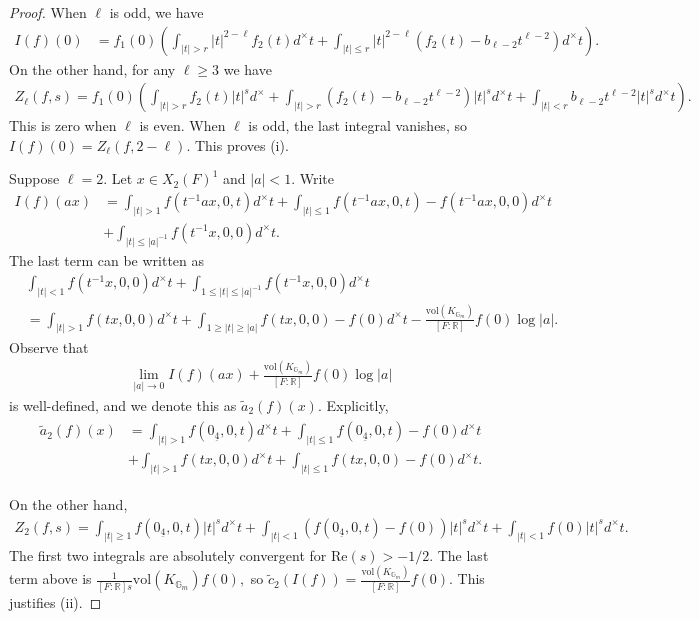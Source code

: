 \documentclass[11pt,a4paper,reqno]{amsart}
\theoremstyle{remark}
\numberwithin{equation}{section}
\newcommand{\RR}{\mathbb{R}}
\newcommand{\GG}{\mathbb{G}}
\theoremstyle{definition}
\numberwithin{equation}{section}
\begin{document}
\begin{proof}
    When $\ell$ is odd, we have 
    \begin{align*}
        I(f)(0)&=f_1(0)\left(\int_{|t|>r} |t|^{2-\ell}f_2(t) d^\times t+\int_{|t|\le r} |t|^{2-\ell}\left(f_2(t)-b_{\ell-2}t^{\ell-2}\right) d^\times t\right).
    \end{align*}
    On the other hand, for any $\ell\ge 3$ we have
    \begin{align*}
        Z_\ell(f,s)=f_1(0)\left(\int_{|t|>r} f_2(t)|t|^{s}d^\times+\int_{|t|>r} (f_2(t)-b_{\ell-2}t^{\ell-2})|t|^sd^\times t+\int_{|t|<r} b_{\ell-2}t^{\ell-2}|t|^s d^\times t\right).
    \end{align*}
    This is zero when $\ell$ is even. When $\ell$ is odd, the last integral vanishes, so $I(f)(0)=Z_\ell(f,2-\ell).$ This proves (i). 
    
    Suppose $\ell=2$. Let $x\in X_2(F)^1 $ and $|a|<1$. Write
    \begin{align*}
        I(f)(ax)&=\int_{|t|>1} f(t^{-1}ax,0,t)d^\times t+ \int_{|t|\le 1} f(t^{-1}ax,0,t)-f(t^{-1}ax,0,0)d^\times t\\
        &+\int_{|t|\le |a|^{-1}} f(t^{-1}x,0,0)d^\times t.
    \end{align*}
    The last term can be written as
    \begin{align*}
         &\int_{|t|< 1} f(t^{-1}x,0,0)d^\times t+\int_{1\le |t|\le |a|^{-1}} f(t^{-1}x,0,0)d^\times t\\
    &=\int_{|t|> 1} f(tx,0,0)d^\times t+\int_{1\ge |t|\ge|a|} f(tx,0,0)-f(0)d^\times t -\frac{\mathrm{vol}(K_{\GG_m})}{[F:\RR]}f(0)\log |a|.
    \end{align*}
    Observe that
    \begin{align*}
        \lim_{|a|\to 0} I(f)(ax)+\frac{\mathrm{vol}(K_{\GG_m})}{[F:\RR]}f(0)\log |a| 
    \end{align*}
    is well-defined, and we denote this as $\tilde{a}_2(f)(x)$. Explicitly,
    \begin{align}\label{eq:a2:arch}
    \begin{split}
        \tilde{a}_2(f)(x)&=\int_{|t|>1} f(0_{\underline{4}},0,t)d^\times t+ \int_{|t|\le 1} f(0_{\underline{4}},0,t)-f(0)d^\times t\\
        &+\int_{|t|> 1} f(tx,0,0)d^\times t+\int_{|t|\le 1} f(tx,0,0)-f(0)d^\times t.
    \end{split}
    \end{align}
    
    
    On the other hand,
    \begin{align}\label{eq:Z2compute}
        Z_2(f,s)=\int_{|t|\ge 1} f(0_{\underline{4}},0,t)|t|^s d^\times t+\int_{|t|<1} (f(0_{\underline{4}},0,t)-f(0))|t|^s d^\times t+\int_{|t|<1} f(0)|t|^s d^\times t.
    \end{align}
    The first two integrals are absolutely convergent for $\mathrm{Re}(s)>-1/2$. The last term above is $\frac{1}{[F:\RR]s}\mathrm{vol}(K_{\GG_m})f(0),$ so $\tilde{c}_2(I(f))=\frac{\mathrm{vol}(K_{\GG_m})}{[F:\RR]}f(0).$ This justifies (ii).
\end{proof}
\end{document}
